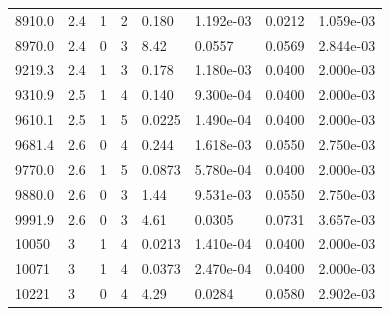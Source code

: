 \documentclass[preview]{standalone}
\begin{document}
{{{\begin{tabular}{L{1.2cm}C{1.2cm} C{0.3cm}C{0.5cm} C{1.4cm}C{1.4cm} C{1.4cm}C{1.4cm}}
  8910.0  &   2.4  & 1     &  2 &  0.180  & 1.192e-03  & 0.0212 &  1.059e-03   \\ 
  8970.0  &   2.4  & 0     &  3 &  8.42  & 0.0557  & 0.0569 &  2.844e-03   \\ 
  9219.3  &   2.4  & 1     &  3 &  0.178  & 1.180e-03  & 0.0400 &  2.000e-03   \\ 
  9310.9  &   2.5  & 1     &  4 &  0.140  & 9.300e-04  & 0.0400 &  2.000e-03   \\ 
  9610.1  &   2.5  & 1     &  5 &  0.0225  & 1.490e-04  & 0.0400 &  2.000e-03   \\ 
  9681.4  &   2.6  & 0     &  4 &  0.244  & 1.618e-03  & 0.0550 &  2.750e-03   \\ 
  9770.0  &   2.6  & 1     &  5 &  0.0873  & 5.780e-04  & 0.0400 &  2.000e-03   \\ 
  9880.0  &   2.6  & 0     &  3 &  1.44  & 9.531e-03  & 0.0550 &  2.750e-03   \\ 
  9991.9  &   2.6  & 0     &  3 &  4.61  & 0.0305  & 0.0731 &  3.657e-03   \\ 
  10050  &     3  & 1     &  4 &  0.0213  & 1.410e-04  & 0.0400 &  2.000e-03   \\ 
  10071  &     3  & 1     &  4 &  0.0373  & 2.470e-04  & 0.0400 &  2.000e-03   \\ 
  10221  &     3  & 0     &  4 &  4.29  & 0.0284  & 0.0580 &  2.902e-03   \\ 
\hline 
\end{tabular} 

}}}
\end{document}
